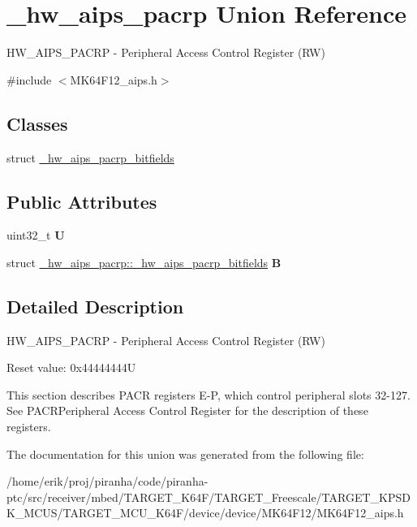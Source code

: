 \hypertarget{union__hw__aips__pacrp}{}\section{\+\_\+hw\+\_\+aips\+\_\+pacrp Union Reference}
\label{union__hw__aips__pacrp}


H\+W\+\_\+\+A\+I\+P\+S\+\_\+\+P\+A\+C\+RP -\/ Peripheral Access Control Register (RW)  




{\ttfamily \#include $<$M\+K64\+F12\+\_\+aips.\+h$>$}

\subsection*{Classes}
\begin{DoxyCompactItemize}
\item 
struct \hyperlink{struct__hw__aips__pacrp_1_1__hw__aips__pacrp__bitfields}{\+\_\+hw\+\_\+aips\+\_\+pacrp\+\_\+bitfields}
\end{DoxyCompactItemize}
\subsection*{Public Attributes}
\begin{DoxyCompactItemize}
\item 
uint32\+\_\+t {\bfseries U}\hypertarget{union__hw__aips__pacrp_a36ffd8dee2cf02d572a1794452415f92}{}\label{union__hw__aips__pacrp_a36ffd8dee2cf02d572a1794452415f92}

\item 
struct \hyperlink{struct__hw__aips__pacrp_1_1__hw__aips__pacrp__bitfields}{\+\_\+hw\+\_\+aips\+\_\+pacrp\+::\+\_\+hw\+\_\+aips\+\_\+pacrp\+\_\+bitfields} {\bfseries B}\hypertarget{union__hw__aips__pacrp_a52abb0a3ca5d862d9f185a8558f5c02d}{}\label{union__hw__aips__pacrp_a52abb0a3ca5d862d9f185a8558f5c02d}

\end{DoxyCompactItemize}


\subsection{Detailed Description}
H\+W\+\_\+\+A\+I\+P\+S\+\_\+\+P\+A\+C\+RP -\/ Peripheral Access Control Register (RW) 

Reset value\+: 0x44444444U

This section describes P\+A\+CR registers E-\/P, which control peripheral slots 32-\/127. See P\+A\+C\+R\+Peripheral Access Control Register for the description of these registers. 

The documentation for this union was generated from the following file\+:\begin{DoxyCompactItemize}
\item 
/home/erik/proj/piranha/code/piranha-\/ptc/src/receiver/mbed/\+T\+A\+R\+G\+E\+T\+\_\+\+K64\+F/\+T\+A\+R\+G\+E\+T\+\_\+\+Freescale/\+T\+A\+R\+G\+E\+T\+\_\+\+K\+P\+S\+D\+K\+\_\+\+M\+C\+U\+S/\+T\+A\+R\+G\+E\+T\+\_\+\+M\+C\+U\+\_\+\+K64\+F/device/device/\+M\+K64\+F12/M\+K64\+F12\+\_\+aips.\+h\end{DoxyCompactItemize}
